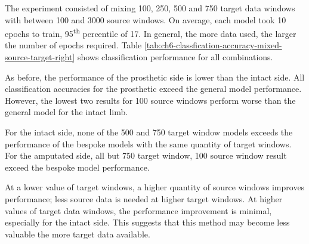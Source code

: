 The experiment consisted of mixing 100, 250, 500 and 750 target data windows with between 100 and 3000 source windows. On average, each model took 10 epochs to train, 95\textsuperscript{th} percentile of 17. In general, the more data used, the larger the number of epochs required. Table \ref{tab:ch6-classfication-accuracy-mixed-source-target-right} shows classification performance for all combinations.

As before, the performance of the prosthetic side is lower than the intact side. All classification accuracies for the prosthetic exceed the general model performance. However, the lowest two results for 100 source windows perform worse than the general model for the intact limb.

For the intact side, none of the 500 and 750 target window models exceeds the performance of the bespoke models with the same quantity of target windows. For the amputated side, all but 750 target window, 100 source window result exceed the bespoke model performance.

At a lower value of target windows, a higher quantity of source windows improves performance; less source data is needed at higher target windows. At higher values of target data windows, the performance improvement is minimal, especially for the intact side. This suggests that this method may become less valuable the more target data available.

